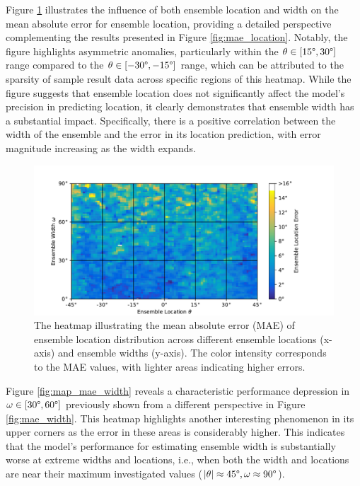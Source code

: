 \documentclass[11pt]{article}
\begin{document}
Figure \ref{fig:map_mae_location} illustrates the influence of both ensemble location and width on the mean absolute error for ensemble location, providing a detailed perspective complementing the results presented in Figure \ref{fig:mae_location}. Notably, the figure highlights asymmetric anomalies, particularly within the $\theta \in [15\degree, 30\degree]$ range compared to the $\theta \in [-30\degree, -15\degree]$ range, which can be attributed to the sparsity of sample result data across specific regions of this heatmap. While the figure suggests that ensemble location does not significantly affect the model's precision in predicting location, it clearly demonstrates that ensemble width has a substantial impact. Specifically, there is a positive correlation between the width of the ensemble and the error in its location prediction, with error magnitude increasing as the width expands.

\begin{figure}[ht!]
  \centering
  \includegraphics[width=\linewidth]{../figures/map_mae_location.pdf}
  \caption{\label{fig:map_mae_location}The heatmap illustrating the mean absolute error (MAE) of ensemble location distribution across different ensemble locations (x-axis) and ensemble widths (y-axis). The color intensity corresponds to the MAE values, with lighter areas indicating higher errors.}
\end{figure}

Figure \ref{fig:map_mae_width} reveals a characteristic performance depression in $\omega \in [30\degree, 60\degree]$ previously shown from a different perspective in Figure \ref{fig:mae_width}. This heatmap highlights another interesting phenomenon in its upper corners as the error in these areas is considerably higher. This indicates that the model's performance for estimating ensemble width is substantially worse at extreme widths and locations, i.e., when both the width and locations are near their maximum investigated values ($|\theta| \approx 45\degree, \omega \approx 90\degree$).
\end{document}
